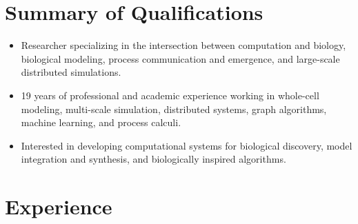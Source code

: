 
\makecvtitle

\section{Summary of Qualifications}

\begin{itemize}
\item Researcher specializing in the intersection between computation and biology, biological modeling, process communication and emergence, and large-scale distributed simulations. 
\item 19 years of professional and academic experience working in whole-cell modeling, multi-scale simulation, distributed systems, graph algorithms, machine learning, and process calculi. 
\item Interested in developing computational systems for biological discovery, model integration and synthesis, and biologically inspired algorithms. 
\end{itemize}

\section{Experience}




